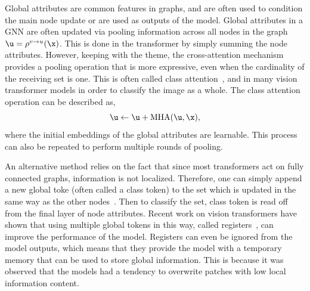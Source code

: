 Global attributes are common features in graphs, and are often used to condition the main node update or are used as outputs of the model.
Global attributes in a GNN are often updated via pooling information across all nodes in the graph $ \u = \rho^{v \to u}(\x)$.
This is done in the transformer by simply summing the node attributes.
However, keeping with the theme, the cross-attention mechanism provides a pooling operation that is more expressive, even when the cardinality of the receiving set is one.
This is often called class attention~, and in many vision transformer models in order to classify the image as a whole.
The class attention operation can be described as,
\begin{equation}
    \u \leftarrow \u + \text{MHA}(\u, \x),
\end{equation}
where the initial embeddings of the global attributes are learnable.
This process can also be repeated to perform multiple rounds of pooling.

An alternative method relies on the fact that since most transformers act on fully connected graphs, information is not localized.
Therefore, one can simply append a new global toke (often called a class token) to the set which is updated in the same way as the other nodes~.
Then to classify the set, class token is read off from the final layer of node attributes.
Recent work on vision transformers have shown that using multiple global tokens in this way, called registers~, can improve the performance of the model.
Registers can even be ignored from the model outputs, which means that they provide the model with a temporary memory that can be used to store global information.
This is because it was observed that the models had a tendency to overwrite patches with low local information content.

